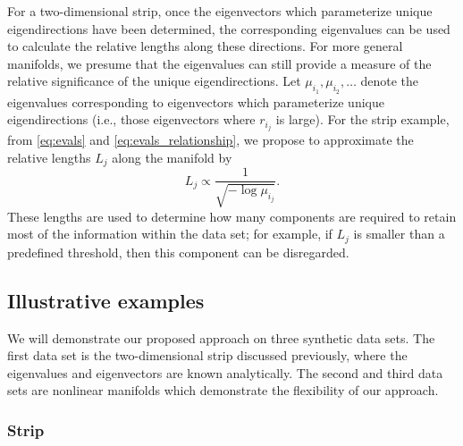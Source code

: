 \documentclass[preprint]{elsarticle}
\begin{document}
For a two-dimensional strip, once the eigenvectors which parameterize unique eigendirections have been determined, the corresponding eigenvalues can be used to calculate the relative lengths along these directions. 
%
For more general manifolds, we presume that the eigenvalues can still provide a measure of the relative significance of the unique eigendirections.
%
Let $\mu_{i_1}, \mu_{i_2}, \dots$ denote the eigenvalues corresponding to eigenvectors which parameterize unique eigendirections (i.e., those eigenvectors where $r_{i_j}$ is large). 
%
For the strip example, from \eqref{eq:evals} and \eqref{eq:evals_relationship}, we propose to approximate the relative lengths $L_j$  along the manifold by
\begin{equation} \label{eq:est_lengths}
L_j \propto \frac{1}{\sqrt{-\log \mu_{i_j}}}.
\end{equation}
%
These lengths are used to determine how many components are required to retain most of the information within the data set; 
for example, if $L_j$ is smaller than a predefined threshold, then this component can be disregarded. 


\subsection{Illustrative examples} \label{sec:illustrative_examples}

We will demonstrate our proposed approach on three synthetic data sets. 
%
The first data set is the two-dimensional strip discussed previously, where the eigenvalues and eigenvectors are known analytically.
%
The second and third data sets are nonlinear manifolds which demonstrate the flexibility of our approach. 

\subsubsection{Strip}
\end{document}
